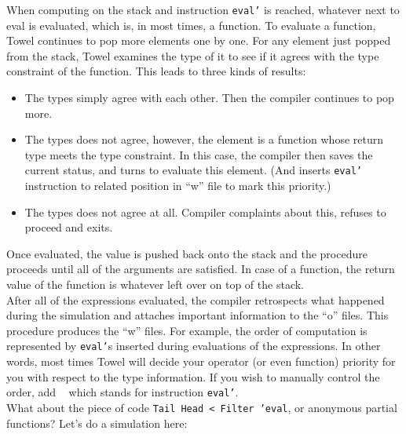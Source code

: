 \documentclass{article}
\begin{document}
When computing on the stack and instruction \texttt{eval'} is reached, whatever next to eval is evaluated, which is, in most times, a function. To evaluate a function, Towel continues to pop more elements one by one. For any element just popped from the stack, Towel examines the type of it to see if it agrees with the type constraint of the function. This leads to three kinds of results:

\begin{itemize}
\item The types simply agree with each other. Then the compiler continues to pop more.
\item The types does not agree, however, the element is a function whose return type meets the type constraint. In this case, the compiler then saves the current status, and turns to evaluate this element. (And inserts \texttt{eval'} instruction to related position in ``w'' file to mark this priority.)
\item The types does not agree at all. Compiler complaints about this, refuses to proceed and exits.
\end{itemize}

Once evaluated, the value is pushed back onto the stack and the procedure proceeds until all of the arguments are satisfied. In case of a function, the return value of the function is whatever left over on top of the stack.\\

After all of the expressions evaluated, the compiler retrospects what happened during the simulation and attaches important information to the ``o'' files. This procedure produces the ``w'' files. For example, the order of computation is represented by \texttt{eval'}s inserted during evaluations of the expressions. In other words, most times Towel will decide your operator (or even function) priority for you with respect to the type information. If you wish to manually control the order, add \texttt{~} which stands for instruction \texttt{eval'}.\\

What about the piece of code \texttt{Tail Head < Filter 'eval}, or anonymous partial functions? Let's do a simulation here:
\end{document}
